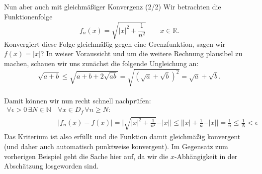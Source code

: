 \begin{Beispiel}
    {Nun aber auch mit gleichmäßiger Konvergenz (2/2)}
    Wir betrachten die Funktionenfolge
    \begin{equation*}
        f_n(x)=\sqrt{\vert x \vert^2 + \frac{1}{n^2}} \qquad x \in \mathbb{R}.
    \end{equation*}
    Konvergiert diese Folge gleichmäßig gegen eine Grenzfunktion, sagen wir $f(x)=\vert x \vert$? In weiser Voraussicht und um die weitere Rechnung plausibel zu machen, schauen wir uns zunächst die folgende Ungleichung an: 
    \begin{equation*}
        \sqrt{a+b} \leq \sqrt{a+b+2\sqrt{ab}} = \sqrt{(\sqrt{a}+\sqrt{b})^2}=\sqrt{a}+\sqrt{b}.
    \end{equation*} \\
    
    Damit können wir nun recht schnell nachprüfen:
    \begin{align*}
        \forall \epsilon > 0 \,\exists N\in\mathbb{N}\, &\forall x\in D_f \,\forall n\geq N: \\
            &\vert f_n(x)-f(x) \vert = \bigl| \sqrt{\vert x \vert^2 + \frac{1}{n^2}} - \vert x \vert \bigr| \leq \bigl| \vert x \vert + \frac{1}{n} - \vert x \vert \bigr| = \frac{1}{n} \leq \frac{1}{N} < \epsilon
    \end{align*}
    Das Kriterium ist also erfüllt und die Funktion damit gleichmäßig konvergent (und daher auch automatisch punktweise konvergent). Im Gegensatz zum vorherigen Beispiel geht die Sache hier auf, da wir die $x$-Abhängigkeit in der Abschätzung losgeworden sind.
\end{Beispiel}

